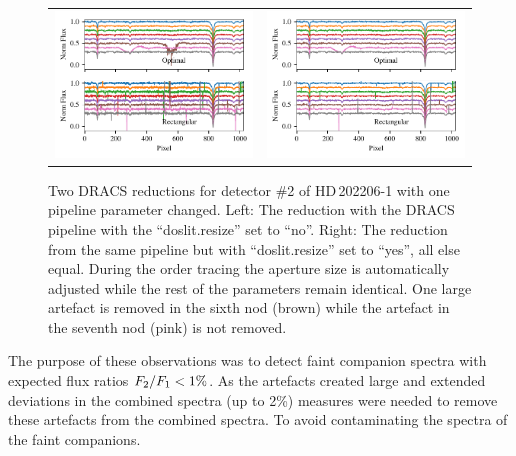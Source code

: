 \begin{figure}
    \centering
    \begin{tabular}{cc}
        \includegraphics[width=0.47\linewidth]{figures/reduction/bp_plots/non_resized_nods_HD202206-1_chip_2} & \includegraphics[width=0.47\linewidth]{figures/reduction/bp_plots/resized_nods_HD202206-1_chip_2}\\
    \end{tabular}\label{fig:resizednods}
    \caption[Artefacts comparision with and altered pipeline parameter.]{Two {DRACS} reductions for detector \#2 of HD\,202206-1 with one pipeline parameter changed.
        Left: The reduction with the {DRACS} pipeline with the ``doslit.resize'' set to ``no''.
        Right: The reduction from the same pipeline but with ``doslit.resize'' set to ``yes'', all else equal.
        During the order tracing the aperture size is automatically adjusted while the rest of the parameters remain identical.
        One large artefact is removed in the sixth nod (brown) while the artefact in the seventh nod (pink) is not removed.}
\end{figure}

The purpose of these observations was to detect faint companion spectra with expected flux ratios \({F}_{2}{}/{F}_{1}{}{} < 1\%\).
As the artefacts created large and extended deviations in the combined spectra (up to 2\%) measures were needed to remove these artefacts from the combined spectra.
To avoid contaminating the spectra of the faint companions.

